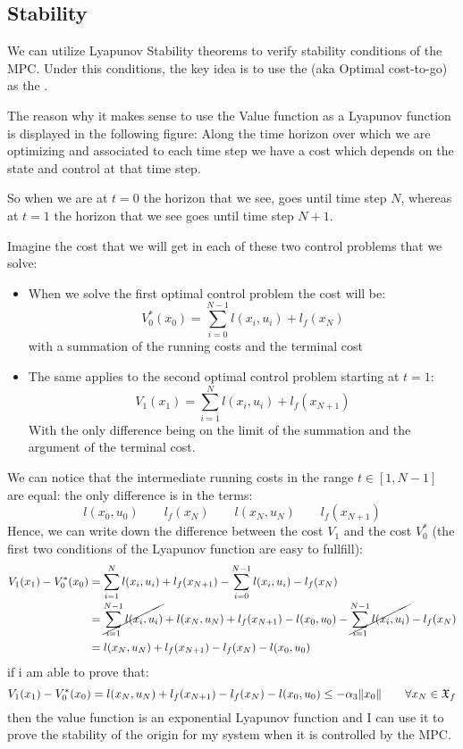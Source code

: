 \subsection{Stability}
We can utilize Lyapunov Stability theorems to verify stability conditions of the MPC. Under this conditions, the key idea is to use the  (aka Optimal cost-to-go) as the .

The reason why it makes sense to use the Value function as a Lyapunov function is displayed in the following figure:
Along the time horizon over which we are optimizing and associated to each time step we have a cost which depends on the state and control at that time step.

So when we are at $t=0$ the horizon that we see, goes until time step $N$, whereas at $t=1$ the horizon that we see goes until time step $N+1$.

Imagine the cost that we will get in each of these two control problems that we solve:
\begin{itemize}
\item When we solve the first optimal control problem the cost will be:
\[V_0^*(x_0) = \sum_{i=0}^{N-1} l(x_i,u_i) + l_f(x_N)\]
with a summation of the running costs and the terminal cost
\item The same applies to the second optimal control problem starting at $t=1$:
\[V_1(x_1) = \sum_{i=1}^{N} l(x_i, u_i) + l_f(x_{N+1})\]
With the only difference being on the limit of the summation and the argument of the terminal cost.
\end{itemize}


We can notice that the intermediate running costs in the range $t\in[1,N-1]$ are equal: the only difference is in the terms:
\[l(x_0,u_0)\qquad l_f(x_N) \qquad l(x_N, u_N)\qquad l_f(x_{N+1})\]
Hence, we can write down the difference between the cost $V_1$ and the cost $V_0^*$ (the first two conditions of the Lyapunov function are easy to fullfill):
\begin{align*}
V_1(x_1) - V_0^*(x_0) &= \sum_{i=1}^{N}l(x_i,u_i) + l_f(x_{N+1}) - \sum_{i=0}^{N-1}l(x_i,u_i) - l_f(x_N)\\
&= \cancel{\sum_{i=1}^{N-1} l(x_i,u_i)} + l(x_N, u_N) + l_f(x_{N+1}) - l(x_0,u_0) - \cancel{\sum_{i=1}^{N-1} l(x_i,u_i)} - l_f(x_N)\\
&= l(x_N, u_N) + l_f(x_{N+1}) - l_f(x_N) - l(x_0, u_0)
\end{align*}
if i am able to prove that:
\[V_1(x_1) - V_0^*(x_0)  = l(x_N, u_N) + l_f(x_{N+1}) - l_f(x_N) - l(x_0, u_0) \le -\alpha_3 \lVert x_0\rVert\qquad \forall x_N\in\mathfrak{X}_f\]
then the value function is an exponential Lyapunov function and I can use it to prove the stability of the origin for my system when it is controlled by the MPC.

